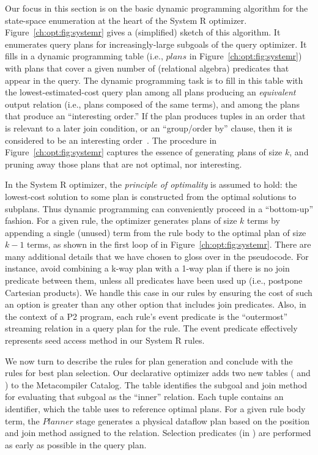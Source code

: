 Our focus in this section is on the basic dynamic programming algorithm for the
state-space enumeration at the heart of the System R optimizer.
Figure~\ref{ch:opt:fig:systemr} gives a (simplified) sketch of this algorithm.
It enumerates query plans for increasingly-large subgoals of the query
optimizer.  It fills in a dynamic programming table (i.e., $plans$ in
Figure~\ref{ch:opt:fig:systemr}) with plans that cover a given number of
(relational algebra) predicates that appear in the query.  The dynamic
programming task is to fill in this table with the lowest-estimated-cost query
plan among all plans producing an {\em equivalent} output relation (i.e., plans
composed of the same terms), and among the plans that produce an ``interesting
order.'' If the plan produces tuples in an order that is relevant to a later
join condition, or an ``group/order by'' clause, then it is considered to be an
interesting order~\cite{selinger}.  The  procedure in
Figure~\ref{ch:opt:fig:systemr} captures the essence of generating {\emph
plans} of size $k$, and pruning away those plans that are not optimal, nor
interesting.

In the System R optimizer, the {\em principle of optimality} is assumed to
hold: the lowest-cost solution to some plan is constructed from the optimal
solutions to subplans.  Thus dynamic programming can conveniently proceed in a
``bottom-up'' fashion.  For a given rule, the optimizer generates plans of size
$k$ terms by appending a single (unused) term from the rule body to the optimal
plan of size $k-1$ terms, as shown in the first loop of  in
Figure~\ref{ch:opt:fig:systemr}.  There are many additional details that we
have chosen to gloss over in the pseudocode.  For instance, avoid combining a
k-way plan with a 1-way plan if there is no join predicate between them, unless
all predicates have been used up (i.e., postpone Cartesian products).  We
handle this case in our \OVERLOG rules by ensuring the cost of such an option is
greater than any other option that includes join predicates.  Also, in the
context of a P2 program, each rule's event predicate is the ``outermost''
streaming relation in a query plan for the rule.  The event predicate
effectively represents seed access method in our System R rules.

We now turn to describe the \OVERLOG rules for plan generation and conclude
with the rules for best plan selection.  Our declarative optimizer adds two new
tables ( and ) to the Metacompiler Catalog.  The
 table identifies the subgoal and join method for evaluating that
subgoal as the ``inner'' relation.  Each  tuple contains an
identifier, which the  table uses to reference optimal plans.  For
a given rule body term, the $Planner$ stage generates a physical dataflow plan
based on the position and join method assigned to the 
relation.  Selection predicates (in ) are performed as early as
possible in the query plan.

